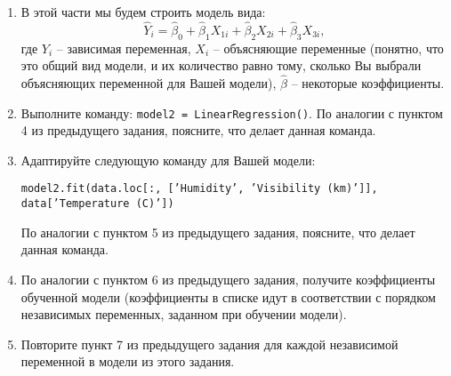 \documentclass[11pt, a4paper]{extarticle}
\begin{document}
\begin{enumerate}
	\item В этой части мы будем строить модель вида:
	\[
	\hat{Y}_i = \hat{\beta}_0 + \hat{\beta}_1X_{1i} +  \hat{\beta}_2X_{2i} + \hat{\beta}_3X_{3i},
	\]
	где $Y_i$ – зависимая переменная, $X_i$ – объясняющие переменные (понятно, что это общий вид модели, и их количество равно тому, сколько Вы выбрали объясняющих переменной для Вашей модели), $\hat{\beta}$ – некоторые коэффициенты. 
	
	\item Выполните команду: {\tt model2 = LinearRegression()}. По аналогии с пунктом 4 из предыдущего задания, поясните, что делает данная команда. 
	
	\item Адаптируйте следующую команду для Вашей модели: 
	
	 {\tt model2.fit(data.loc[:, ['Humidity', 'Visibility (km)']], data['Temperature (C)'])}
	 
	  По аналогии с пунктом 5 из предыдущего задания, поясните, что делает данная команда. 
	
	\item По аналогии с пунктом 6 из предыдущего задания, получите коэффициенты обученной модели (коэффициенты в списке идут в соответствии с порядком независимых переменных, заданном при обучении модели). 
	
	\item Повторите пункт 7 из предыдущего задания для каждой независимой переменной в модели из этого задания. 
\end{enumerate}
\end{document}
